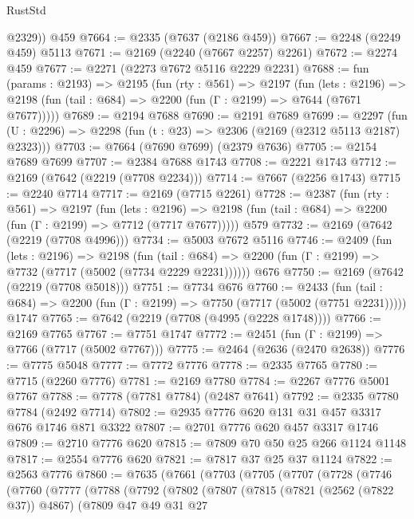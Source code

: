 \begin{lexlean}{RustStd}
\begin{coremodule}
{\begin{coremodule}
{{{{{{{{{{{{{{{        @2329))
    @459
@7664 := @2335 (@7637 (@2186 @459))
@7667 := @2248 (@2249 @459) @5113
@7671 := @2169 (@2240 (@7667 @2257) @2261)
@7672 := @2274 @459
@7677 := @2271 (@2273 @7672 @5116 @2229 @2231)
@7688 := fun (params : @2193) =>
  @2195
    (fun (rty : @561) =>
    @2197
      (fun (lets : @2196) =>
      @2198 (fun (tail : @684) => @2200 (fun (Γ : @2199) => @7644 (@7671 @7677)))))
@7689 := @2194 @7688
@7690 := @2191 @7689
@7699 := @2297 (fun (U : @2296) => @2298 (fun (t : @23) => @2306 (@2169 (@2312 @5113 @2187) @2323)))
@7703 := @7664 (@7690 @7699) (@2379 @7636)
@7705 := @2154 @7689 @7699
@7707 := @2384 @7688 @1743
@7708 := @2221 @1743
@7712 := @2169 (@7642 (@2219 (@7708 @2234)))
@7714 := @7667 (@2256 @1743)
@7715 := @2240 @7714
@7717 := @2169 (@7715 @2261)
@7728 := @2387
    (fun (rty : @561) =>
    @2197
      (fun (lets : @2196) =>
      @2198 (fun (tail : @684) => @2200 (fun (Γ : @2199) => @7712 (@7717 @7677)))))
    @579
@7732 := @2169 (@7642 (@2219 (@7708 @4996)))
@7734 := @5003 @7672 @5116
@7746 := @2409
    (fun (lets : @2196) =>
    @2198
      (fun (tail : @684) => @2200 (fun (Γ : @2199) => @7732 (@7717 (@5002 (@7734 @2229 @2231))))))
    @676
@7750 := @2169 (@7642 (@2219 (@7708 @5018)))
@7751 := @7734 @676
@7760 := @2433
    (fun (tail : @684) => @2200 (fun (Γ : @2199) => @7750 (@7717 (@5002 (@7751 @2231)))))
    @1747
@7765 := @7642 (@2219 (@7708 (@4995 (@2228 @1748))))
@7766 := @2169 @7765
@7767 := @7751 @1747
@7772 := @2451 (fun (Γ : @2199) => @7766 (@7717 (@5002 @7767)))
@7775 := @2464 (@2636 (@2470 @2638))
@7776 := @7775 @5048
@7777 := @7772 @7776
@7778 := @2335 @7765
@7780 := @7715 (@2260 @7776)
@7781 := @2169 @7780
@7784 := @2267 @7776 @5001 @7767
@7788 := @7778 (@7781 @7784) (@2487 @7641)
@7792 := @2335 @7780 @7784 (@2492 @7714)
@7802 := @2935 @7776 @620 @131 @31 @457 @3317 @676 @1746 @871 @3322
@7807 := @2701 @7776 @620 @457 @3317 @1746
@7809 := @2710 @7776 @620
@7815 := @7809 @70 @50 @25 @266 @1124 @1148
@7817 := @2554 @7776 @620
@7821 := @7817 @37 @25 @37 @1124
@7822 := @2563 @7776
@7860 := @7635
    (@7661
      (@7703
        (@7705
          (@7707
            (@7728
              (@7746
                (@7760
                  (@7777
                    (@7788
                      (@7792
                        (@7802
                          (@7807
                            (@7815
                              (@7821 (@2562 (@7822 @37)) @4867)
                              (@7809
                                @47
                                @49
                                @31
                                @27
}}}}}}}}}}}}}}}
\end{coremodule}}
\end{coremodule}
\end{lexlean}
